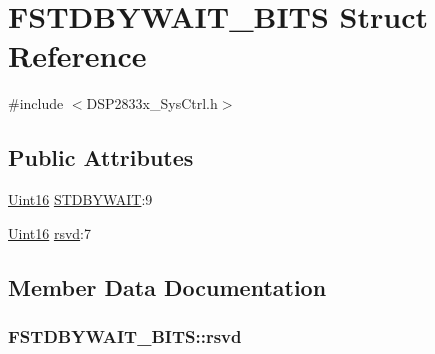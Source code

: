 \hypertarget{struct_f_s_t_d_b_y_w_a_i_t___b_i_t_s}{}\section{F\+S\+T\+D\+B\+Y\+W\+A\+I\+T\+\_\+\+B\+I\+T\+S Struct Reference}
\label{struct_f_s_t_d_b_y_w_a_i_t___b_i_t_s}


{\ttfamily \#include $<$D\+S\+P2833x\+\_\+\+Sys\+Ctrl.\+h$>$}

\subsection*{Public Attributes}
\begin{DoxyCompactItemize}
\item 
\hyperlink{_d_s_p2833x___device_8h_a59a9f6be4562c327cbfb4f7e8e18f08b}{Uint16} \hyperlink{struct_f_s_t_d_b_y_w_a_i_t___b_i_t_s_aa8b04e63dce365a4be147052f0e81966}{S\+T\+D\+B\+Y\+W\+A\+I\+T}\+:9
\item 
\hyperlink{_d_s_p2833x___device_8h_a59a9f6be4562c327cbfb4f7e8e18f08b}{Uint16} \hyperlink{struct_f_s_t_d_b_y_w_a_i_t___b_i_t_s_aa05420e317ff33994846ee579aa96d97}{rsvd}\+:7
\end{DoxyCompactItemize}


\subsection{Member Data Documentation}
\hypertarget{struct_f_s_t_d_b_y_w_a_i_t___b_i_t_s_aa05420e317ff33994846ee579aa96d97}{}
\subsubsection[{rsvd}]{ F\+S\+T\+D\+B\+Y\+W\+A\+I\+T\+\_\+\+B\+I\+T\+S\+::rsvd}\label{struct_f_s_t_d_b_y_w_a_i_t___b_i_t_s_aa05420e317ff33994846ee579aa96d97}
\hypertarget{struct_f_s_t_d_b_y_w_a_i_t___b_i_t_s_aa8b04e63dce365a4be147052f0e81966}{}
